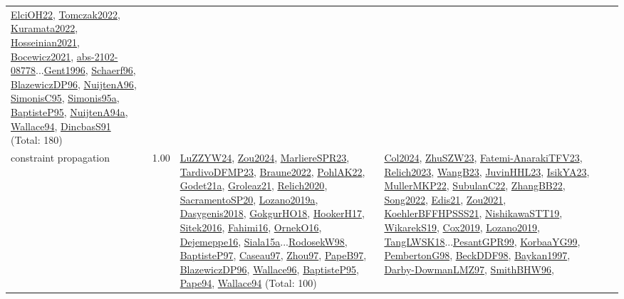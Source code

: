 {\begin{longtable}{p{3cm}r>{\raggedright\arraybackslash}p{6cm}>{\raggedright\arraybackslash}p{6cm}>{\raggedright\arraybackslash}p{8cm}}
\hyperref[detail:ElciOH22]{ElciOH22}, \hyperref[detail:Tomczak2022]{Tomczak2022}, \hyperref[detail:Kuramata2022]{Kuramata2022}, \hyperref[detail:Hosseinian2021]{Hosseinian2021}, \hyperref[detail:Bocewicz2021]{Bocewicz2021}, \hyperref[detail:abs-2102-08778]{abs-2102-08778}...\hyperref[detail:Gent1996]{Gent1996}, \hyperref[detail:Schaerf96]{Schaerf96}, \hyperref[detail:BlazewiczDP96]{BlazewiczDP96}, \hyperref[detail:NuijtenA96]{NuijtenA96}, \hyperref[detail:SimonisC95]{SimonisC95}, \hyperref[detail:Simonis95a]{Simonis95a}, \hyperref[detail:BaptisteP95]{BaptisteP95}, \hyperref[detail:NuijtenA94a]{NuijtenA94a}, \hyperref[detail:Wallace94]{Wallace94}, \hyperref[detail:DincbasS91]{DincbasS91} (Total: 180)\\
\index{constraint propagation}\index{CP!constraint propagation}constraint propagation &  1.00 & \hyperref[detail:LuZZYW24]{LuZZYW24}, \hyperref[detail:Zou2024]{Zou2024}, \hyperref[detail:MarliereSPR23]{MarliereSPR23}, \hyperref[detail:TardivoDFMP23]{TardivoDFMP23}, \hyperref[detail:Braune2022]{Braune2022}, \hyperref[detail:PohlAK22]{PohlAK22}, \hyperref[detail:Godet21a]{Godet21a}, \hyperref[detail:Groleaz21]{Groleaz21}, \hyperref[detail:Relich2020]{Relich2020}, \hyperref[detail:SacramentoSP20]{SacramentoSP20}, \hyperref[detail:Lozano2019a]{Lozano2019a}, \hyperref[detail:Dasygenis2018]{Dasygenis2018}, \hyperref[detail:GokgurHO18]{GokgurHO18}, \hyperref[detail:HookerH17]{HookerH17}, \hyperref[detail:Sitek2016]{Sitek2016}, \hyperref[detail:Fahimi16]{Fahimi16}, \hyperref[detail:OrnekO16]{OrnekO16}, \hyperref[detail:Dejemeppe16]{Dejemeppe16}, \hyperref[detail:Siala15a]{Siala15a}...\hyperref[detail:RodosekW98]{RodosekW98}, \hyperref[detail:BaptisteP97]{BaptisteP97}, \hyperref[detail:Caseau97]{Caseau97}, \hyperref[detail:Zhou97]{Zhou97}, \hyperref[detail:PapeB97]{PapeB97}, \hyperref[detail:BlazewiczDP96]{BlazewiczDP96}, \hyperref[detail:Wallace96]{Wallace96}, \hyperref[detail:BaptisteP95]{BaptisteP95}, \hyperref[detail:Pape94]{Pape94}, \hyperref[detail:Wallace94]{Wallace94} (Total: 100) & \hyperref[detail:Col2024]{Col2024}, \hyperref[detail:ZhuSZW23]{ZhuSZW23}, \hyperref[detail:Fatemi-AnarakiTFV23]{Fatemi-AnarakiTFV23}, \hyperref[detail:Relich2023]{Relich2023}, \hyperref[detail:WangB23]{WangB23}, \hyperref[detail:JuvinHHL23]{JuvinHHL23}, \hyperref[detail:IsikYA23]{IsikYA23}, \hyperref[detail:MullerMKP22]{MullerMKP22}, \hyperref[detail:SubulanC22]{SubulanC22}, \hyperref[detail:ZhangBB22]{ZhangBB22}, \hyperref[detail:Song2022]{Song2022}, \hyperref[detail:Edis21]{Edis21}, \hyperref[detail:Zou2021]{Zou2021}, \hyperref[detail:KoehlerBFFHPSSS21]{KoehlerBFFHPSSS21}, \hyperref[detail:NishikawaSTT19]{NishikawaSTT19}, \hyperref[detail:WikarekS19]{WikarekS19}, \hyperref[detail:Cox2019]{Cox2019}, \hyperref[detail:Lozano2019]{Lozano2019}, \hyperref[detail:TangLWSK18]{TangLWSK18}...\hyperref[detail:PesantGPR99]{PesantGPR99}, \hyperref[detail:KorbaaYG99]{KorbaaYG99}, \hyperref[detail:PembertonG98]{PembertonG98}, \hyperref[detail:BeckDDF98]{BeckDDF98}, \hyperref[detail:Baykan1997]{Baykan1997}, \hyperref[detail:Darby-DowmanLMZ97]{Darby-DowmanLMZ97}, \hyperref[detail:SmithBHW96]{SmithBHW96}, 
\end{longtable}}
